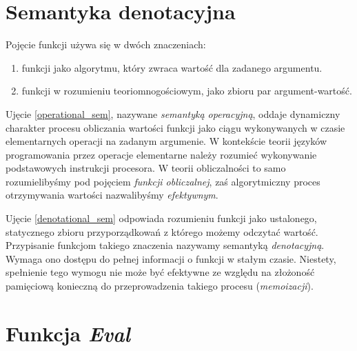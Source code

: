 \section{Semantyka denotacyjna}
Pojęcie funkcji używa się w dwóch znaczeniach:
\begin{enumerate}[label=(\alph*)]
\item funkcji jako algorytmu, który zwraca wartość dla zadanego argumentu.\label{operational_sem}
\item funkcji w rozumieniu teoriomnogościowym, jako zbioru par argument-wartość.
\label{denotational_sem}
\end{enumerate}

Ujęcie \ref{operational_sem}, nazywane \emph{semantyką operacyjną}, oddaje dynamiczny charakter procesu obliczania wartości funkcji jako ciągu wykonywanych w czasie elementarnych operacji na zadanym argumenie. W kontekście teorii języków programowania przez operacje elementarne należy rozumieć wykonywanie podstawowych instrukcji procesora. W teorii obliczalności to samo rozumielibyśmy pod pojęciem \emph{funkcji obliczalnej}, zaś algorytmiczny proces otrzymywania wartości nazwalibyśmy \emph{efektywnym}.

Ujęcie \ref{denotational_sem} odpowiada rozumieniu funkcji jako ustalonego, statycznego zbioru przyporządkowań z którego możemy odczytać wartość. Przypisanie funkcjom takiego znaczenia nazywamy semantyką \emph{denotacyjną}. Wymaga ono dostępu do pełnej informacji o funkcji w stałym czasie. Niestety, spełnienie tego wymogu nie może być efektywne ze względu na złożoność pamięciową konieczną do przeprowadzenia takiego procesu (\emph{memoizacji}).

\section{Funkcja \emph{Eval}}

